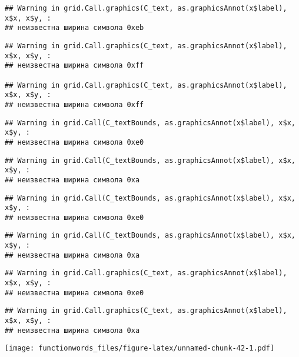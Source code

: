 \documentclass[
]{article}
\begin{document}
\begin{verbatim}
## Warning in grid.Call.graphics(C_text, as.graphicsAnnot(x$label), x$x, x$y, :
## неизвестна ширина символа 0xeb
\end{verbatim}

\begin{verbatim}
## Warning in grid.Call.graphics(C_text, as.graphicsAnnot(x$label), x$x, x$y, :
## неизвестна ширина символа 0xff

## Warning in grid.Call.graphics(C_text, as.graphicsAnnot(x$label), x$x, x$y, :
## неизвестна ширина символа 0xff
\end{verbatim}

\begin{verbatim}
## Warning in grid.Call(C_textBounds, as.graphicsAnnot(x$label), x$x, x$y, :
## неизвестна ширина символа 0xe0
\end{verbatim}

\begin{verbatim}
## Warning in grid.Call(C_textBounds, as.graphicsAnnot(x$label), x$x, x$y, :
## неизвестна ширина символа 0xa
\end{verbatim}

\begin{verbatim}
## Warning in grid.Call(C_textBounds, as.graphicsAnnot(x$label), x$x, x$y, :
## неизвестна ширина символа 0xe0
\end{verbatim}

\begin{verbatim}
## Warning in grid.Call(C_textBounds, as.graphicsAnnot(x$label), x$x, x$y, :
## неизвестна ширина символа 0xa
\end{verbatim}

\begin{verbatim}
## Warning in grid.Call.graphics(C_text, as.graphicsAnnot(x$label), x$x, x$y, :
## неизвестна ширина символа 0xe0
\end{verbatim}

\begin{verbatim}
## Warning in grid.Call.graphics(C_text, as.graphicsAnnot(x$label), x$x, x$y, :
## неизвестна ширина символа 0xa
\end{verbatim}

\texttt{[image: functionwords\_files/figure-latex/unnamed-chunk-42-1.pdf]}
\end{document}
